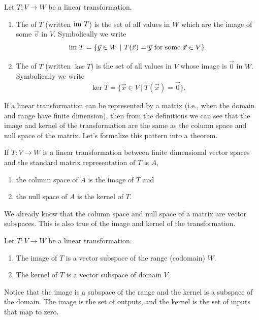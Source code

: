 \begin{definition}
Let $T\colon V\to W$ be a linear transformation.  
\begin{enumerate}
	\item The  of $T$ (written $\text{im } T$) is the set of all values in $W$ which are the image of some $\vec v$ in $V$. 
	Symbolically we write $$\text{im } T = \{\vec y\in W \ | \ T(\vec x)=\vec y \text{ for some $\vec x\in V$}\}.$$ 
	\item The  of $T$ (written $\ker T$) is the set of all values in $V$ whose image is $\vec 0$ in $W$. 
	Symbolically we write $$\ker T = \{\vec x\in V \ | \ T(\vec x)=\vec 0\}.$$
\end{enumerate}
\end{definition}



If a linear transformation can be represented by a matrix (i.e., when the domain and range have finite dimension), then from the definitions we can see that the image and kernel of the transformation are the same as the column space and null space of the matrix.  Let's formalize this pattern into a theorem.

\begin{theorem}
If $T\colon V\to W$ is a linear transformation between finite dimensional vector spaces and the standard matrix representation of $T$ is $A$, 
\begin{enumerate}
	\item the column space of $A$ is the image of $T$ and 
	\item the null space of $A$ is the kernel of $T$.
\end{enumerate}
\end{theorem}

We already know that the column space and null space of a matrix are vector subspaces.  This is also true of the image and kernel of the transformation.

\begin{theorem}
Let $T\colon V\to W$ be a linear transformation. 
\begin{enumerate}
	\item The image of $T$ is a vector subspace of the range (codomain) $W$. 
	\item The kernel of $T$ is a vector subspace of domain $V$.
\end{enumerate}
\end{theorem}
Notice that the image is a subspace of the range and the kernel is a subspace of the domain. The image is the set of outputs, and the kernel is the set of inputs that map to zero. 

